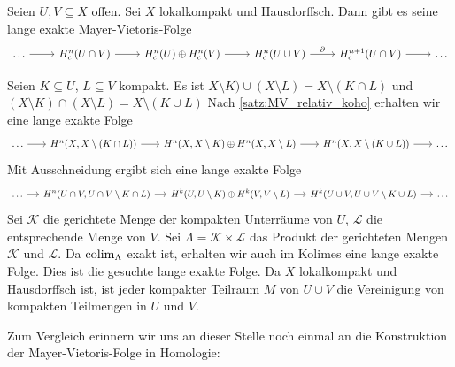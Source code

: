 \begin{satz}[{name=[{Mayer-Vietoris-Folge in Kohomologie mit kompaktem Träger}]}]
	Seien $U,V \subseteq X$ offen. Sei $X$ lokalkompakt und Hausdorffsch. 
	Dann gibt es seine lange exakte Mayer-Vietoris-Folge 
	\[
		\begin{tikzcd}
			\ldots \rar & H^n_c(U\cap V) \rar & H^n_c(U) \oplus H^n_c(V) \rar & H^n_c(U \cup V) \rar["\partial"] & H^{n+1}_c(U\cap V) \rar & \ldots 
		\end{tikzcd}
	\]
\end{satz}
\begin{beweis}
	Seien $K \subseteq U$, $L \subseteq V$ kompakt. 
	Es ist $X\setminus K) \cup (X\setminus L) = X \setminus (K \cap L)$ und $(X \setminus K) \cap (X \setminus L) = X \setminus (K \cup L)$
	Nach \autoref{satz:MV_relativ_koho} erhalten wir eine lange exakte Folge 
	\[
		\begin{tikzcd}[sep=1.9em]
			\ldots \rar & H^n \enbrace*{X,X \setminus (K \cap L)} \rar & H^n \enbrace*{X,X \setminus K} \oplus H^n(X,X \setminus L) \rar & H^n \enbrace*{X,X \setminus (K \cup L)} \rar & \ldots 
		\end{tikzcd}
	\]
	Mit Ausschneidung ergibt sich eine lange exakte Folge 
	\[
		\begin{tikzcd}[sep=small,font=\small]
			\ldots  \rar & H^n \enbrace*{U \cap V, U  \cap V  \setminus K \cap L} \rar & H^k(U,U \setminus K) \oplus H^k(V,V \setminus L) \rar & H^k(U \cup V, U \cup V \setminus K \cup L) \rar & \ldots 
		\end{tikzcd}
	\]
	Sei $\mathcal{K}$ die gerichtete Menge der kompakten Unterräume von $U$, $\mathcal{L}$ die entsprechende Menge von $V$.
	Sei $\Lambda = \mathcal{K} \times \mathcal{L}$ das Produkt der gerichteten Mengen $\mathcal{K}$ und $\mathcal{L}$.
	Da $\operatorname*{colim}_\Lambda$ exakt ist, erhalten wir auch im Kolimes eine lange exakte Folge. Dies ist die gesuchte lange exakte Folge. 
	Da $X$ lokalkompakt und Hausdorffsch ist, ist jeder kompakter Teilraum $M$ von $U \cup V$ die Vereinigung von kompakten Teilmengen in $U$ und $V$.
\end{beweis}

Zum Vergleich erinnern wir uns an dieser Stelle noch einmal an die Konstruktion der Mayer-Vietoris-Folge in Homologie:

